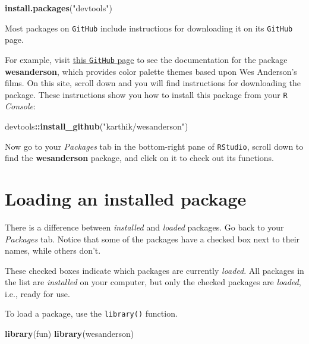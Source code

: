 \documentclass[
]{book}
\newenvironment{Shaded}{\begin{snugshade}}{\end{snugshade}}
\newcommand{\KeywordTok}[1]{\textcolor[rgb]{0.13,0.29,0.53}{\textbf{#1}}}
\newcommand{\NormalTok}[1]{#1}
\newcommand{\OperatorTok}[1]{\textcolor[rgb]{0.81,0.36,0.00}{\textbf{#1}}}
\newcommand{\StringTok}[1]{\textcolor[rgb]{0.31,0.60,0.02}{#1}}
\begin{document}
\begin{Shaded}
\begin{Highlighting}[]
\KeywordTok{install.packages}\NormalTok{(}\StringTok{"devtools"}\NormalTok{)}
\end{Highlighting}
\end{Shaded}

Most packages on \texttt{GitHub} include instructions for downloading it on its \texttt{GitHub} page.

For example, visit \href{https://github.com/karthik/wesanderson}{this \texttt{GitHub} page} to see the documentation for the package \textbf{wesanderson}, which provides color palette themes based upon Wes Anderson's films. On this site, scroll down and you will find instructions for downloading the package. These instructions show you how to install this package from your \texttt{R} \emph{Console}:

\begin{Shaded}
\begin{Highlighting}[]
\NormalTok{devtools}\OperatorTok{::}\KeywordTok{install_github}\NormalTok{(}\StringTok{"karthik/wesanderson"}\NormalTok{)}
\end{Highlighting}
\end{Shaded}

Now go to your \emph{Packages} tab in the bottom-right pane of \texttt{RStudio}, scroll down to find the \textbf{wesanderson} package, and click on it to check out its functions.

\hypertarget{loading-an-installed-package}{%
\section*{Loading an installed package}\label{loading-an-installed-package}}

There is a difference between \emph{installed} and \emph{loaded} packages. Go back to your \emph{Packages} tab. Notice that some of the packages have a checked box next to their names, while others don't.

These checked boxes indicate which packages are currently \emph{loaded}. All packages in the list are \emph{installed} on your computer, but only the checked packages are \emph{loaded}, i.e., ready for use.

To load a package, use the \texttt{library()} function.

\begin{Shaded}
\begin{Highlighting}[]
\KeywordTok{library}\NormalTok{(fun)}
\KeywordTok{library}\NormalTok{(wesanderson)}
\end{Highlighting}
\end{Shaded}
\end{document}
